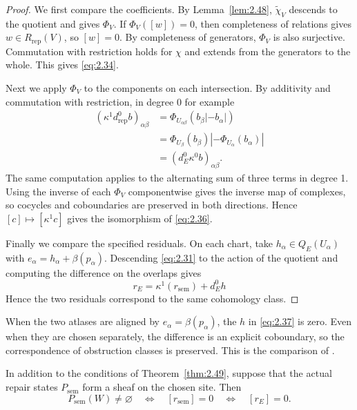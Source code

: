 \begin{proof}

We first compare the coefficients. By Lemma~\ref{lem:2.48}, $\widetilde\chi_V$ descends
to the quotient and gives $\Phi_V$. If $\Phi_V([w])=0$, then completeness of relations
gives $w\in R_{\mathrm{rep}}(V)$, so $[w]=0$. By completeness of generators, $\Phi_V$ is
also surjective. Commutation with restriction holds for $\chi$ and extends from the
generators to the whole. This gives \eqref{eq:2.34}.

Next we apply $\Phi_V$ to the components on each intersection. By additivity and
commutation with restriction, in degree 0 for example
\[
\begin{aligned}
(\kappa^1d^0_{\mathrm{rep}}b)_{\alpha\beta}
&=\Phi_{U_{\alpha\beta}}(b_\beta|-b_\alpha|)\\
&=\Phi_{U_\beta}(b_\beta)|-\Phi_{U_\alpha}(b_\alpha)|\\
&=(d^0_E\kappa^0b)_{\alpha\beta}.
\end{aligned}
\]
The same computation applies to the alternating sum of three terms in degree 1. Using
the inverse of each $\Phi_V$ componentwise gives the inverse map of complexes, so
cocycles and coboundaries are preserved in both directions. Hence
$[c]\mapsto[\kappa^1c]$ gives the isomorphism of \eqref{eq:2.36}.

Finally we compare the specified residuals. On each chart, take
$h_\alpha\in Q_E(U_\alpha)$ with $e_\alpha=h_\alpha+\beta(p_\alpha)$. Descending
\eqref{eq:2.31} to the action of the quotient and computing the difference on the
overlaps gives
\begin{equation*}
r_E=\kappa^1(r_{\mathrm{sem}})+d^0_Eh
\tag{2.37}\label{eq:2.37}
\end{equation*}
Hence the two residuals correspond to the same cohomology class.

\end{proof}

When the two atlases are aligned by $e_\alpha=\beta(p_\alpha)$, the $h$ in
\eqref{eq:2.37} is zero. Even when they are chosen separately, the difference is an
explicit coboundary, so the correspondence of obstruction classes is preserved. This is
the comparison of
\cite[\href{https://arxiv.org/html/2608.21458v1\#S5}{Theorem~5.1(i)--(ii),
\S\S5.3--5.5}]{SAGA}.

\begin{corollary}\label{cor:2.50}

In addition to the conditions of Theorem~\ref{thm:2.49}, suppose that the actual repair
states $P_{\mathrm{sem}}$ form a sheaf on the chosen site. Then
\begin{equation*}
P_{\mathrm{sem}}(W)\ne\varnothing
\quad\Longleftrightarrow\quad
[r_{\mathrm{sem}}]=0
\quad\Longleftrightarrow\quad
[r_E]=0.
\tag{2.38}\label{eq:2.38}
\end{equation*}

\end{corollary}

